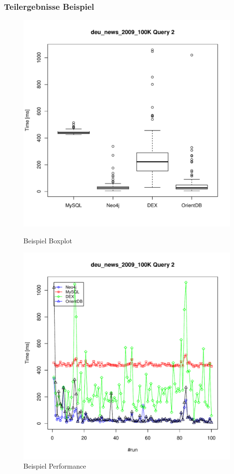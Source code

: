 \documentclass{beamer}
\begin{document}
\begin{frame}\frametitle{Teilergebnisse Beispiel}

\begin{figure}[ht]
\begin{minipage}[b]{0.45\linewidth}
\centering
\includegraphics[scale=0.3]{../results/cold caches/images/100K_query2_boxplot.pdf}
\caption{Beispiel Boxplot}
\label{fig:mysql_schema}
\end{minipage}
\hspace{0.5cm}
\begin{minipage}[b]{0.45\linewidth}
\centering
\includegraphics[scale=0.3]{../results/cold caches/images/100K_query2_perf.pdf}
\caption{Beispiel Performance}
\label{fig:graph_schema}
\end{minipage}
\end{figure}
\end{frame}
\end{document}
